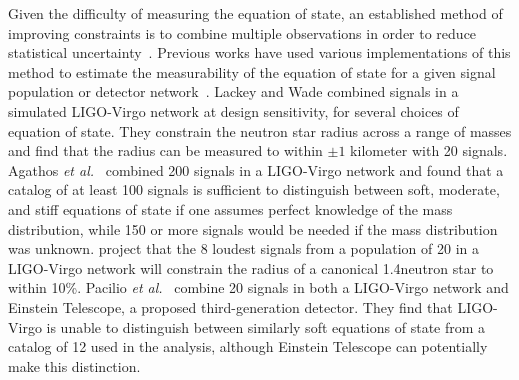 Given the difficulty of measuring the equation of state, an established method of improving constraints is to combine multiple observations in order to reduce statistical uncertainty~\cite{DelPozzo:2013ala}. Previous works have used various implementations of this method to estimate the measurability of the equation of state for a given signal population or detector network~\cite{DelPozzo:2013ala,Lackey:2014fwa,Agathos:2015uaa,Vivanco:2019qnt,Pacilio:2021jmq}. Lackey and Wade \cite{Lackey:2014fwa} combined signals in a simulated LIGO-Virgo network at design sensitivity, for several choices of equation of state. They constrain the neutron star radius across a range of masses and find that the radius can be measured to within $\pm1$ kilometer with 20 signals. Agathos {\it et al.}~\cite{Agathos:2015uaa} combined 200 signals in a LIGO-Virgo network and found that a catalog of at least 100 signals is sufficient to distinguish between soft, moderate, and stiff equations of state if one assumes perfect knowledge of the mass distribution, while 150 or more signals would be needed if the mass distribution was unknown. \cite{Vivanco:2019qnt} project that the 8 loudest signals from a population of 20 in a LIGO-Virgo network will constrain the radius of a canonical 1.4\msun neutron star to within 10\%. Pacilio {\it et al.}~\cite{Pacilio:2021jmq} combine 20 signals in both a LIGO-Virgo network and Einstein Telescope, a proposed third-generation detector. They find that LIGO-Virgo is unable to distinguish between similarly soft equations of state from a catalog of 12 used in the analysis, although Einstein Telescope can potentially make this distinction.

